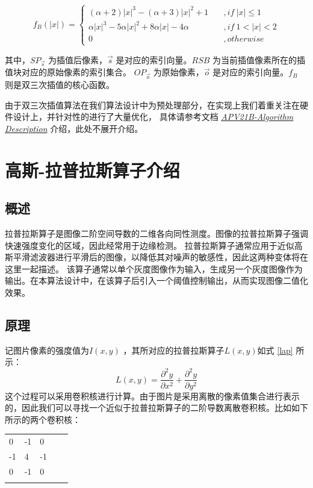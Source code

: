 \documentclass[12pt, a4paper, oneside]{ctexbook}
\begin{document}
	\begin{equation}
		f_B(|x|)=
		\begin{cases}
	(\alpha + 2)|x|^3-(\alpha+3)|x|^2+1\quad &,if\ |x| \leq1\\
	\alpha|x|^3-5\alpha|x|^2+8\alpha|x|-4\alpha\quad&,if \ 1<|x|<2\\
	0&,otherwise				
	\label{bicubic_2}
		\end{cases}
	\end{equation}
	\par
	其中，$SP_{\vec{s}}$ 为插值后像素，$\vec{s}$ 是对应的索引向量。$RSB$ 为当前插值像素所在的插值块对应的原始像素的索引集合。
	$OP_{\vec{o}}$ 为原始像素，$\vec{o}$ 是对应的索引向量。$f_B$ 则是双三次插值的核心函数。
	\par 由于双三次插值算法在我们算法设计中为预处理部分，在实现上我们着重关注在硬件设计上，并针对性的进行了大量优化，
	具体请参考文档 \href{./ref/APV21B_Algorithm_Description.pdf}{\textit{APV21B-Algorithm Description}} 介绍，此处不展开介绍。
	
	\section{高斯-拉普拉斯算子介绍}
	\subsection{概述}
	拉普拉斯算子是图像二阶空间导数的二维各向同性测度。图像的拉普拉斯算子强调快速强度变化的区域，因此经常用于边缘检测。
	拉普拉斯算子通常应用于近似高斯平滑滤波器进行平滑后的图像，以降低其对噪声的敏感性，因此这两种变体将在这里一起描述。
	该算子通常以单个灰度图像作为输入，生成另一个灰度图像作为输出。在本算法设计中，在该算子后引入一个阈值控制输出，从而实现图像二值化效果。
	\subsection{原理}
	记图片像素的强度值为$I(x,y)$ ，其所对应的拉普拉斯算子$L(x,y)$如式 \ref{lap} 所示：
	\begin{equation}	\label{lap}
		L(x,y)=\frac{\partial ^2 y}{\partial x^2} + \frac{\partial ^2 y}{\partial y^2}
	\end{equation}
	这个过程可以采用卷积核进行计算。由于图片是采用离散的像素值集合进行表示的，因此我们可以寻找一个近似于拉普拉斯算子的二阶导数离散卷积核。比如如下所示的两个卷积核：
	\begin{table}[h]
		\centering
		\begin{tabular}{lllll}
			\cline{1-3}
			\multicolumn{1}{|l|}{0}  & \multicolumn{1}{l|}{-1} & \multicolumn{1}{l|}{0}  &  &  \\ \cline{1-3}
			\multicolumn{1}{|l|}{-1} & \multicolumn{1}{l|}{4}  & \multicolumn{1}{l|}{-1} &  &  \\ \cline{1-3}
			\multicolumn{1}{|l|}{0}  & \multicolumn{1}{l|}{-1} & \multicolumn{1}{l|}{0}  &  &  \\ \cline{1-3}
			&                         &                         &  & 
		\end{tabular}
	\end{table}
\end{document}
